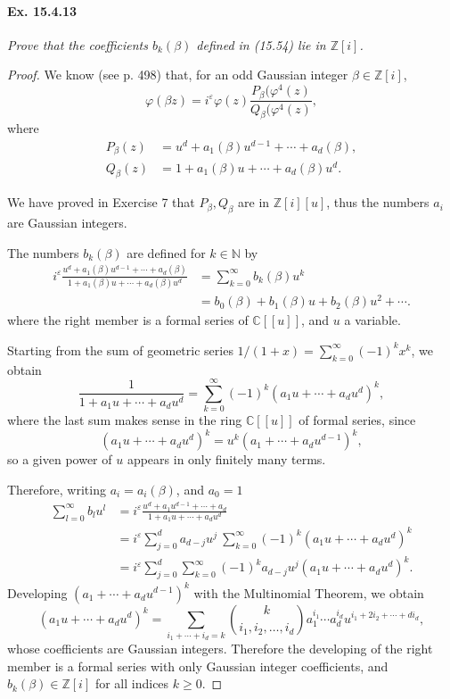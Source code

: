 \documentclass[11pt,a4paper]{article}
\newcommand{\Z}{\mathbb{Z}}
\newcommand{\N}{\mathbb{N}}
\newcommand{\C}{\mathbb{C}}
\begin{document}
\paragraph{Ex. 15.4.13}{\it  Prove that the coefficients $b_k(\beta)$ defined in (15.54) lie in $\Z[i]$.
}

\begin{proof}
We know (see p. 498) that, for an odd Gaussian integer $\beta \in \Z[i]$, 
$$\varphi(\beta z) = i^\varepsilon \varphi(z) \frac{P_\beta(\varphi^4(z)}{Q_\beta(\varphi^4(z)},$$
where
\begin{align*}
P_\beta(z) &= u^d + a_1(\beta)u^{d-1}+ \cdots + a_d(\beta),\\
Q_\beta(z) &= 1 + a_1(\beta) u + \cdots + a_d(\beta) u^d.
\end{align*}

We have proved in Exercise 7 that $P_\beta, Q_\beta$ are in $\Z[i][u]$, thus the numbers $a_i$ are Gaussian integers.

The numbers $b_k(\beta)$ are  defined for $k \in \N$ by
\begin{align*}
i^\varepsilon \frac{u^d + a_1(\beta)u^{d-1}+ \cdots + a_d(\beta)}{1 + a_1(\beta) u + \cdots + a_d(\beta) u^d} &= \sum_{k=0}^\infty b_k(\beta) u^k\\
&= b_0(\beta) + b_1(\beta)u + b_2(\beta) u^2+\cdots.
\end{align*}
where the right member is a formal series of $\C[[u]]$, and $u$ a variable.

Starting from the sum of geometric series $1/(1+x) = \sum_{k=0}^\infty(-1)^k x^k$, we obtain
$$\frac{1}{1+a_1u+\cdots+a_d u^d} = \sum_{k=0}^\infty (-1)^k(a_1u + \cdots +a_du^d)^k,$$
where the last sum makes sense in the ring $\C[[u]]$ of formal series, since 
$$(a_1u+\cdots+a_d u^d)^k = u^k(a_1+\cdots+a_du^{d-1})^k,$$
so a given power of $u$ appears in only finitely many terms.

Therefore, writing $a_i = a_i(\beta)$, and $a_0 = 1$
\begin{align*} 
\sum_{l=0}^\infty b_l u^l&=i^\varepsilon \frac{u^d + a_1u^{d-1}+ \cdots + a_d}{1 + a_1 u + \cdots + a_d u^d}\\
&=i^\varepsilon  \sum_{j=0}^d a_{d-j} u^j \ \sum_{k=0}^\infty (-1)^k(a_1u + \cdots +a_du^d)^k\\
&= i^\varepsilon  \sum_{j=0}^d\sum_{k=0}^\infty  (-1)^ka_{d-j} u^{j} (a_1u+\cdots+a_du^{d})^k.
\end{align*}
Developing $(a_1+\cdots+a_du^{d-1})^k$ with the Multinomial Theorem, we obtain
$$(a_1u+\cdots+a_du^{d})^k = \sum_{i_1+\cdots+ i_{d}= k} \binom{k}{i_1,i_2,\ldots,i_{d}} a_1^{i_1}\cdots a_d^{i_{d}} u^{i_1+2i_2+ \cdots+di_d},
$$
whose coefficients are Gaussian integers. Therefore the developing of the right member is a formal series with only Gaussian integer coefficients, and $b_k(\beta) \in \Z[i]$ for all  indices $k\geq 0$. 


\end{proof}
\end{document}
